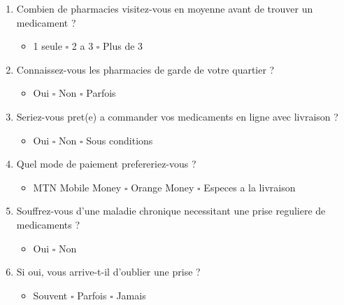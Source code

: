\documentclass[12pt,a4paper]{report}
\begin{document}
\begin{enumerate}
    \item Combien de pharmacies visitez-vous en moyenne avant de trouver un medicament ?
    \begin{itemize}
      \item[$\square$] 1 seule \quad $\square$ 2 a 3 \quad $\square$ Plus de 3
    \end{itemize}

    \item Connaissez-vous les pharmacies de garde de votre quartier ?
    \begin{itemize}
      \item[$\square$] Oui \quad $\square$ Non \quad $\square$ Parfois
    \end{itemize}

    \item Seriez-vous pret(e) a commander vos medicaments en ligne avec livraison ?
    \begin{itemize}
      \item[$\square$] Oui \quad $\square$ Non \quad $\square$  Sous conditions
    \end{itemize}

    \item Quel mode de paiement prefereriez-vous ?
    \begin{itemize}
      \item[$\square$] MTN Mobile Money \quad $\square$ Orange Money \quad $\square$ Especes a la livraison
    \end{itemize}

    \item Souffrez-vous d'une maladie chronique necessitant une prise reguliere de medicaments ?
    \begin{itemize}
      \item[$\square$] Oui \quad $\square$ Non
    \end{itemize}

    \item Si oui, vous arrive-t-il d'oublier une prise ?
    \begin{itemize}
      \item[$\square$] Souvent \quad $\square$ Parfois \quad $\square$ Jamais
    \end{itemize}
\end{enumerate}
\end{document}
